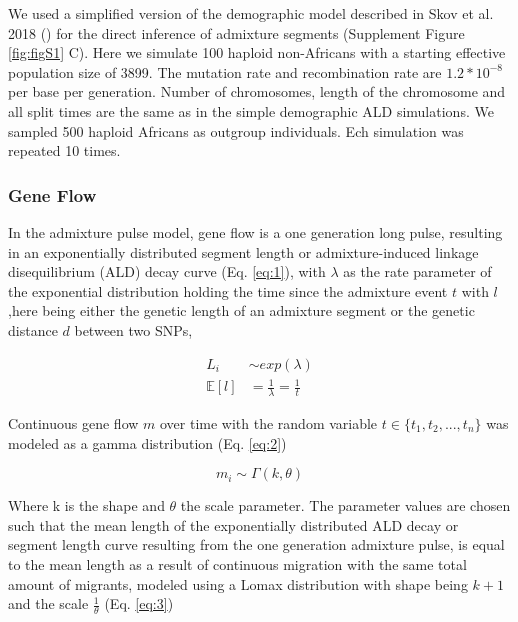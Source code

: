 \documentclass[]{article}
\begin{document}
We used a simplified version of the demographic model described in Skov et al. 2018 (\cite{skov_detecting_2018}) for the direct inference of admixture segments (Supplement Figure \ref{fig:figS1} C). Here we simulate 100 haploid non-Africans with a starting effective population size of 3899. The mutation rate and recombination rate are  \(1.2*10^{-8}\) per base per generation. Number of chromosomes, length of the chromosome and all split times are the same as in the simple demographic ALD simulations. We sampled 500 haploid Africans as outgroup individuals. Ech simulation was repeated 10 times.

\subsubsection{Gene Flow}\label{gene flow}

In the admixture pulse model, gene flow is a one generation long pulse,
resulting in an exponentially distributed segment length or admixture-induced linkage
disequilibrium (ALD) decay curve (Eq. \ref{eq:1}), with $\lambda$ as
the rate parameter of the exponential distribution holding the  time since the admixture event $t$ with $l$ ,here being either the genetic length of an admixture segment or the genetic
distance \(d\) between two SNPs,

\begin{equation}
\begin{split}
\label{eq:1}
L_i &\sim exp(\lambda) \\
\mathbb{E}[l] &= \frac{1}{\lambda} = \frac{1}{t}
\end{split}
\end{equation}

Continuous gene flow $m$ over time with the random variable $t \in \{t_1,t_2,...,t_n\}$ was modeled as a gamma distribution (Eq.
\ref{eq:2})

\begin{equation}
\label{eq:2}
m_i \sim \Gamma(k,\theta)
\end{equation}

Where k is the shape and \(\theta\) the scale parameter. The parameter
values are chosen such that the mean length of the
exponentially distributed ALD decay or segment length curve resulting from the one
generation admixture pulse, is equal to the mean length as a result of continuous migration with the same total amount of
migrants, modeled using a Lomax distribution with shape being $k+1$ and the scale $\frac{1}{\theta}$ (Eq. \ref{eq:3})
\end{document}
